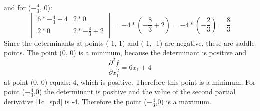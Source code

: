 \documentclass{article}
\begin{document}
and for ($-\frac{4}{3}$, 0):
\begin{equation*}
    \begin{vmatrix}
        6*-\frac{4}{3} + 4 & 2*0 \\ 2*0 & 2*-\frac{4}{3} + 2
    \end{vmatrix} = -4 * (-\frac{8}{3} + 2) = -4 *(-\frac{2}{3}) = \frac{8}{3}
\end{equation*}
Since the determinants at points (-1, 1) and (-1, -1) are negative, these are saddle points. The point (0, 0) is a minimum, because the determinant is positive and 
\begin{equation}
\label{1c_spd}
    \frac{\partial^2 f}{\partial x_1^2} = 6x_1 + 4 
\end{equation}
at point (0, 0) equals: $4$, which is positive. Therefore this point is a minimum. For point ($-\frac{4}{3}$,0) the determinant is positive and the value of the second partial derivative \eqref{1c_spd} is -4. Therefore the point ($-\frac{4}{3}$,0) is a maximum.\\
\end{document}
